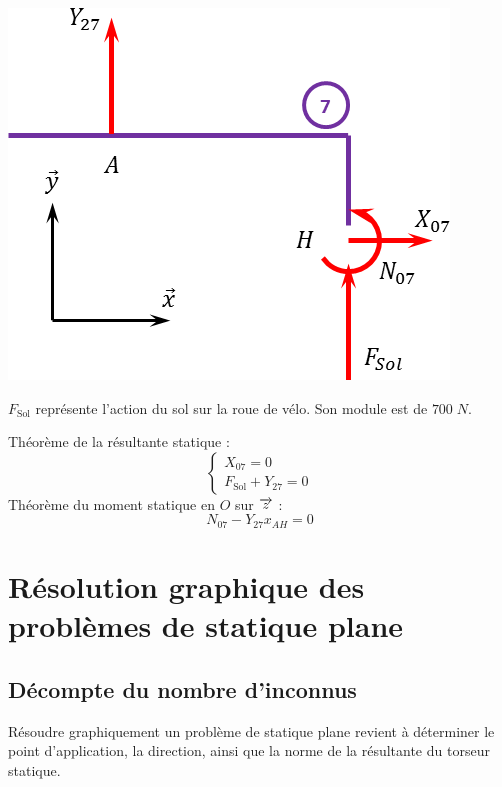 \documentclass[10pt]{article}
\begin{document}
\begin{exemple}
\begin{minipage}[c]{.35\linewidth}
\begin{center}
\includegraphics[width=.9\textwidth]{images/7}
\end{center}
\end{minipage}\hfill
\begin{minipage}[c]{.6\linewidth}
$F_{\text{Sol}}$ représente l'action du sol sur la roue de vélo. Son module est de $700\; N$. 

Théorème de la résultante statique : 
$$
\left\{
\begin{array}{l}
X_{07}=0 \\
F_{\text{Sol}}+Y_{27}=0 
\end{array}
\right.
$$
Théorème du moment statique en $O$ sur $\overrightarrow{z}$ : 
$$
N_{07}-Y_{27}x_{AH}=0
$$
\end{minipage}
\end{exemple}
\section{Résolution graphique des problèmes de statique plane}

\subsection{Décompte du nombre d'inconnus}
Résoudre graphiquement un problème de statique plane revient à déterminer le point d'application, la direction, ainsi que la norme de la résultante du torseur statique. 
\end{document}
